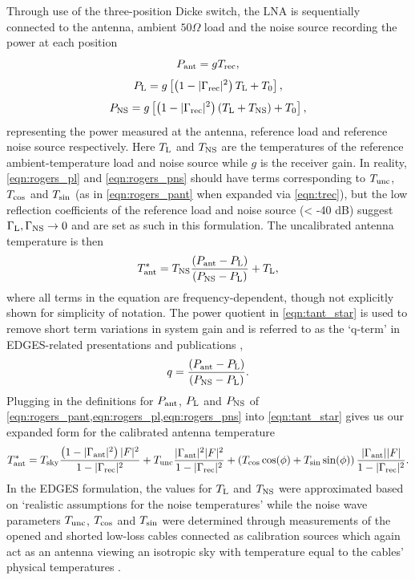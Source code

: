 Through use of the three-position Dicke switch, the LNA is sequentially connected to the antenna, ambient $50\Omega$ load and the noise source recording the power at each position
\begin{equation}
    P_{\mathrm{ant}} = g T_{\mathrm{rec}},
    \label{eqn:rogers_pant}
\end{equation}
\begin{equation}
    P_{\mathrm{L}} = g \left[  \left( 1 - |\Gamma_{\mathrm{rec}}|^2 \right) T_{\mathrm{L}} + T_0 \right],
    \label{eqn:rogers_pl}
\end{equation}
\begin{equation}
    P_{\mathrm{NS}} = g \left[ \left( 1 - |\Gamma_{\mathrm{rec}}|^2 \right) \left( T_{\mathrm{L}} + T_{\mathrm{NS}} \right) + T_0 \right],
    \label{eqn:rogers_pns}
\end{equation}
representing the power measured at the antenna, reference load and reference noise source respectively. Here $T_{\mathrm{L}}$ and $T_{\mathrm{NS}}$ are the temperatures of the reference ambient-temperature load and noise source while $g$ is the receiver gain. In reality, \cref{eqn:rogers_pl} and \cref{eqn:rogers_pns} should have terms corresponding to $T_{\mathrm{unc}}$, $T_{\mathrm{cos}}$ and $T_{\mathrm{\sin}}$ (as in \cref{eqn:rogers_pant} when expanded via \cref{eqn:trec}), but the low reflection coefficients of the reference load and noise source (< -40 dB) suggest $\Gamma_{\mathrm{L}},\Gamma_{\mathrm{NS}}\rightarrow0$ and are set as such in this formulation. The uncalibrated antenna temperature is then
\begin{equation}
    T_{\mathrm{ant}}^* = T_{\mathrm{NS}} \frac{\left( P_{\mathrm{ant}} - P_{\mathrm{L}} \right)}{\left( P_{\mathrm{NS}} - P_{\mathrm{L}} \right)} + T_{\mathrm{L}},
    \label{eqn:tant_star}
\end{equation}
where all terms in the equation are frequency-dependent, though not explicitly shown for simplicity of notation. The power quotient in \cref{eqn:tant_star} is used to remove short term variations in system gain and is referred to as the ‘q-term’ in EDGES-related presentations and publications \citep{murray_calpap},
\begin{equation}
    q =  \frac{\left( P_{\mathrm{ant}} - P_{\mathrm{L}} \right)}{\left( P_{\mathrm{NS}} - P_{\mathrm{L}} \right)}.
    \label{eqn:qterm}
\end{equation}
Plugging in the definitions for $P_{\mathrm{ant}}$, $P_{\mathrm{L}}$ and $P_{\mathrm{NS}}$ of \cref{eqn:rogers_pant,eqn:rogers_pl,eqn:rogers_pns} into \cref{eqn:tant_star} gives us our expanded form for the calibrated antenna temperature
\begin{equation}
    T_{\mathrm{ant}}^* = T_{\mathrm{sky}}\frac{\left(1 - |\Gamma_{\mathrm{ant}}|^2\right)|F|^2}{1 - |\Gamma_{\mathrm{rec}}|^2} + T_{\mathrm{unc}}\frac{|\Gamma_{\mathrm{ant}}|^2|F|^2}{1 - |\Gamma_{\mathrm{rec}}|^2} + \left( T_{\mathrm{cos}}\cos(\phi) + T_{\mathrm{sin}}\sin(\phi) \right)\frac{|\Gamma_{\mathrm{ant}}||F|}{1 - |\Gamma_{\mathrm{rec}}|^2}.
    \label{eqn:rogers_calibrated_temp}
\end{equation}
In the EDGES formulation, the values for $T_{\mathrm{L}}$ and $T_{\mathrm{NS}}$ were approximated based on ‘realistic assumptions for the noise temperatures’ \citep{edgesCal} while the noise wave parameters $T_{\mathrm{unc}}$, $T_{\mathrm{cos}}$ and $T_{\mathrm{sin}}$ were determined through measurements of the opened and shorted low-loss cables connected as calibration sources which again act as an antenna viewing an isotropic sky with temperature equal to the cables’ physical temperatures \citep{rogersCal}.

